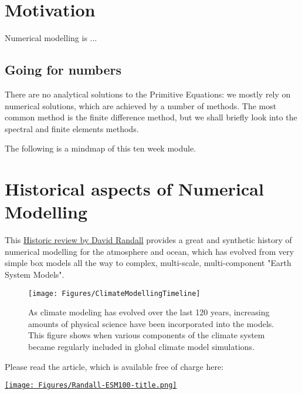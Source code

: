 \documentclass[11pt,fleqn]{book} %
\begin{document}
	\section{Motivation}
	
	\vspace{1em}
	
	Numerical modelling is ...
	
	\vspace{2em}
	
	\subsection{Going for numbers}
	
	\vspace{1em}
	
	There are no analytical solutions to the Primitive Equations: we mostly rely on numerical solutions, which are achieved by a number of methods. The most common method is the finite difference method, but we shall briefly look into the spectral and finite elements methods.
	
	The following is a mindmap of this ten week module.
	
	
	\section{Historical aspects of Numerical Modelling}
	
	This \href{https://journals.ametsoc.org/view/journals/amsm/59/1/amsmonographs-d-18-0018.1.xml}{Historic review by David Randall} provides a great and synthetic history of numerical modelling for the atmosphere and ocean, which has evolved from very simple box models all the way to complex, multi-scale, multi-component "Earth System Models". \\
	
		\begin{figure}[h]
		\texttt{[image: Figures/ClimateModellingTimeline]}
		\caption{As climate modeling has evolved over the last 120 years, increasing amounts of physical science have been incorporated into the models. This figure shows when various components of the climate system became regularly included in global climate model simulations.}
	\end{figure}

	Please read the article, which is available free of charge here:  

\href{https://journals.ametsoc.org/view/journals/amsm/59/1/amsmonographs-d-18-0018.1.xml} {\texttt{[image: Figures/Randall-ESM100-title.png]}}
\end{document}
